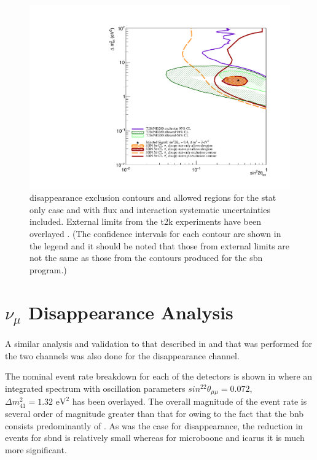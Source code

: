 \begin{figure}
    \centering
    \includegraphics[width = \largefigwidth]{figures-chap6/overlays/valor_overlays_nue_disapp.pdf}
    \caption[\nue disappearance contours with external limits.]{\nue disappearance exclusion contours and allowed regions for the stat only case and with flux and interaction systematic uncertainties included. External limits from the \gls{t2k} experiments have been overlayed \cite{T2K_nue_disapp_contour}. (The confidence intervals for each contour are shown in the legend and it should be noted that those from external limits are not the same as those from the contours produced for the \gls{sbn} program.)}
    \label{fig:nue_disapp_global_sensitivity}
\end{figure}

\newpage
\section{\texorpdfstring{$\nu_\mu$ Disappearance Analysis}{numu Disappearance Analysis}}

A similar analysis and validation to that described in   and  that was performed for the two \nue channels was also done for the \numu disappearance channel.

The nominal event rate breakdown for each of the detectors is shown in  where an integrated spectrum with oscillation parameters $sin^22\theta_{\mu \mu} = 0.072$, $\Delta m^2_{41} = 1.32 \text{ eV}^2$ has been overlayed. The overall magnitude of the event rate is several order of magnitude greater than that for \nue owing to the fact that the \gls{bnb} consists predominantly of \numu. As was the case for \nue disappearance, the reduction in events for \gls{sbnd} is relatively small whereas for \gls{microboone} and \gls{icarus} it is much more significant.

